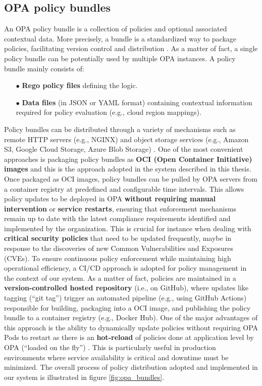 \subsection{OPA policy bundles}
\label{sec:opa_bundles}

An OPA policy bundle is a collection of policies and optional associated contextual data. More precisely, a bundle is a standardized way to package policies, facilitating version control and distribution \cite{opa_bundles}. As a matter of fact, a single policy bundle can be potentially used by multiple OPA instances.
A policy bundle mainly consists of:
\begin{itemize}[itemsep=0.2pt, topsep=1pt]
  \item[$\bullet$] \textbf{Rego policy files} defining the logic.
  \item[$\bullet$] \textbf{Data files} (in JSON or YAML format) containing contextual information required for policy evaluation (e.g., cloud region mappings).
\end{itemize} 

Policy bundles can be distributed through a variety of mechanisms such as remote HTTP servers (e.g., NGINX) and object storage services (e.g., Amazon S3, Google Cloud Storage, Azure Blob Storage) \cite{opa_bundles}.
One of the most convenient approaches is packaging policy bundles as \textbf{OCI (Open Container Initiative) images} \cite{oci} and this is the approach adopted in the system described in this thesis.
Once packaged as OCI images, policy bundles can be pulled by OPA servers from a container registry at predefined and configurable time intervals. 
This allows policy updates to be deployed in OPA \textbf{without requiring manual intervention} or \textbf{service restarts}, ensuring that enforcement mechanisms remain up to date with the latest compliance requirements identified and implemented by the organization. 
This is crucial for instance when dealing with \textbf{critical security policies} that need to be updated frequently, maybe in response to the discoveries of new Common Vulnerabilities and Exposures (CVEs). 
To ensure continuous policy enforcement while maintaining high operational efficiency, a CI/CD approach is adopted for policy management in the context of our system.
As a matter of fact, policies are maintained in a \textbf{version-controlled hosted repository} (i.e., on GitHub), where updates like tagging (``git tag'') trigger an automated pipeline (e.g., using GitHub Actions) responsible for building, packaging into a OCI image, and publishing the policy bundle to a container registry (e.g., Docker Hub).
One of the major advantages of this approach is the ability to dynamically update policies without requiring OPA Pods to restart as there is an \textbf{hot-reload} of policies done at application level by OPA (``loaded on the fly'') \cite{opa_bundles}. 
This is particularly useful in production environments where service availability is critical and downtime must be minimized. 
The overall process of policy distribution adopted and implemented in our system is illustrated in figure \ref{fig:opa_bundles}.

